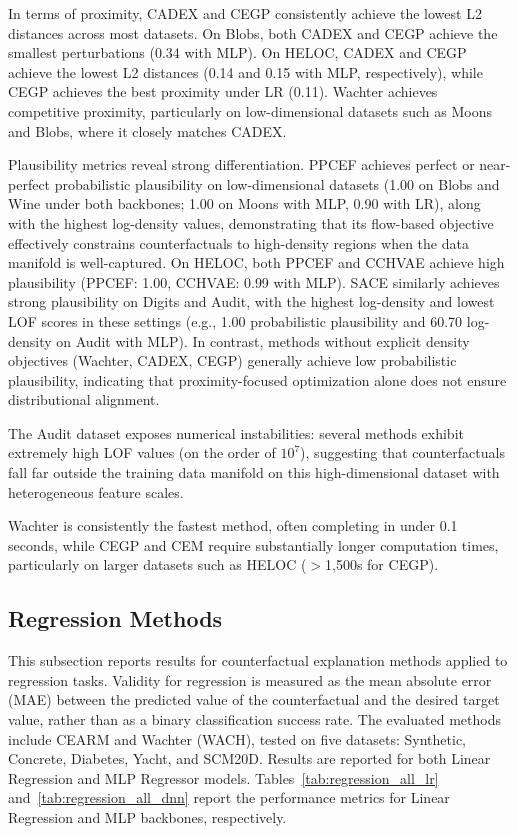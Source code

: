\documentclass[runningheads]{llncs}
\begin{document}
In terms of proximity, CADEX and CEGP consistently achieve the lowest L2 distances across most datasets. On Blobs, both CADEX and CEGP achieve the smallest perturbations (0.34 with MLP). On HELOC, CADEX and CEGP achieve the lowest L2 distances (0.14 and 0.15 with MLP, respectively), while CEGP achieves the best proximity under LR (0.11). Wachter achieves competitive proximity, particularly on low-dimensional datasets such as Moons and Blobs, where it closely matches CADEX.

Plausibility metrics reveal strong differentiation. PPCEF achieves perfect or near-perfect probabilistic plausibility on low-dimensional datasets (1.00 on Blobs and Wine under both backbones; 1.00 on Moons with MLP, 0.90 with LR), along with the highest log-density values, demonstrating that its flow-based objective effectively constrains counterfactuals to high-density regions when the data manifold is well-captured. On HELOC, both PPCEF and CCHVAE achieve high plausibility (PPCEF: 1.00, CCHVAE: 0.99 with MLP). SACE similarly achieves strong plausibility on Digits and Audit, with the highest log-density and lowest LOF scores in these settings (e.g., 1.00 probabilistic plausibility and 60.70 log-density on Audit with MLP). In contrast, methods without explicit density objectives (Wachter, CADEX, CEGP) generally achieve low probabilistic plausibility, indicating that proximity-focused optimization alone does not ensure distributional alignment.

The Audit dataset exposes numerical instabilities: several methods exhibit extremely high LOF values (on the order of $10^{7}$), suggesting that counterfactuals fall far outside the training data manifold on this high-dimensional dataset with heterogeneous feature scales.

Wachter is consistently the fastest method, often completing in under 0.1 seconds, while CEGP and CEM require substantially longer computation times, particularly on larger datasets such as HELOC ($>$1,500s for CEGP).



\subsection{Regression Methods}

This subsection reports results for counterfactual explanation methods applied to regression tasks. Validity for regression is measured as the mean absolute error (MAE) between the predicted value of the counterfactual and the desired target value, rather than as a binary classification success rate. The evaluated methods include CEARM and Wachter (WACH), tested on five datasets: Synthetic, Concrete, Diabetes, Yacht, and SCM20D. Results are reported for both Linear Regression and MLP Regressor models. Tables~\ref{tab:regression_all_lr} and~\ref{tab:regression_all_dnn} report the performance metrics for Linear Regression and MLP backbones, respectively.
\end{document}
